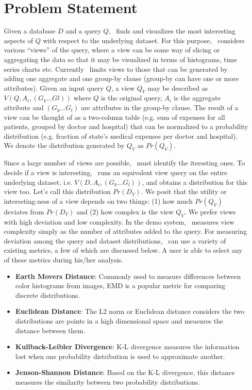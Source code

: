 \section{Problem Statement}
\label{sec:problem_statement}

Given a database $D$ and a query $Q$, \SeeDB\ finds and visualizes the most
interesting aspects of $Q$ with respect to the underlying dataset. For this
purpose, \SeeDB\ considers various ``views'' of the query, where a view can be
some way of slicing or aggregating the data so that it may be visualized in
terms of histograms, time series charts etc. Currently \SeeDB\ limits views to
those that can be generated by adding one aggregate and one group-by clause
(group-by can have one or more attributes). Given an input query $Q$, a view
$Q_V$ may be described as $V(Q, A_i, (G_k\ldots Gl))$ where $Q$ is the original
query, $A_i$ is the aggregate attribute and $(G_k\ldots G_l)$ are attributes in
the group-by clause. The result of a view can be thought of as a two-column
table (e.g. sum of expenses for all patients, grouped by doctor and hospital)
that can be normalized to a probability distribution (e.g.
fraction of state's medical expenses per doctor and hospital). We denote the
distribution generated by $Q_V$ as $Pr(Q_V)$.

Since a large number of views are possible, \SeeDB\ must identify the iteresting
ones. To decide if a view is interesting, \SeeDB\ runs an equivalent view query
on the entire underlying dataset, i.e. $V(D, A_i, (G_k\ldots G_l))$, and obtains
a distribution for this view too. Let's call this distribution $Pr(D_V)$. We
posit that the utility or interesting-ness of a view depends on two things: (1)
how much $Pr(Q_V)$ deviates from $Pr(D_V)$ and (2) how complex is the view
$Q_V$. We prefer views with high deviation and low complexity. In the demo
system, \SeeDB\ measures view complexity simply as the number of attributes
added to the query. For measuring deviation among the query and dataset
distributions, \SeeDB\ can use a variety of existing metrics, a few of which are
discussed below. A user is able to select any of these metrics during his/her
analysis.  

\begin{itemize}
  \item {\bf Earth Movers Distance}: Commonly used to measure differences
  between color histograms from images, EMD is a popular metric for comparing
  discrete distributions.
  \item {\bf Euclidean Distance}: The L2 norm or Euclidean distance considers
  the two distributions are points in a high dimensional space and measures the
  distance between them.
  \item {\bf Kullback-Leibler Divergence}: K-L divergence measures the
  information lost when one probability distribution is used to approximate
  another.
  \item {\bf Jenson-Shannon Distance}: Based on the K-L divergence, this
  distance measures the similarity between two probability distributions.
\end{itemize}


